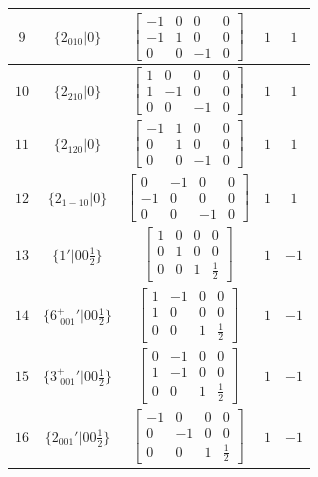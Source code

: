 \documentclass[fleqn,8pt]{jsarticle}
\begin{document}
\begin{longtable}{ccccc}
$ 9 $ & $ \{2{}_{010}|0\} $ & $ \begin{bmatrix} -1 & 0 & 0 & 0 \\ -1 & 1 & 0 & 0 \\ 0 & 0 & -1 & 0 \end{bmatrix} $ & $ 1 $ & $ 1 $ \\ \hline
$ 10 $ & $ \{2{}_{210}|0\} $ & $ \begin{bmatrix} 1 & 0 & 0 & 0 \\ 1 & -1 & 0 & 0 \\ 0 & 0 & -1 & 0 \end{bmatrix} $ & $ 1 $ & $ 1 $ \\ \hline
$ 11 $ & $ \{2{}_{120}|0\} $ & $ \begin{bmatrix} -1 & 1 & 0 & 0 \\ 0 & 1 & 0 & 0 \\ 0 & 0 & -1 & 0 \end{bmatrix} $ & $ 1 $ & $ 1 $ \\ \hline
$ 12 $ & $ \{2{}_{1-10}|0\} $ & $ \begin{bmatrix} 0 & -1 & 0 & 0 \\ -1 & 0 & 0 & 0 \\ 0 & 0 & -1 & 0 \end{bmatrix} $ & $ 1 $ & $ 1 $ \\ \hline
$ 13 $ & $ \{1{}'|0 0 \frac{1}{2}\} $ & $ \begin{bmatrix} 1 & 0 & 0 & 0 \\ 0 & 1 & 0 & 0 \\ 0 & 0 & 1 & \frac{1}{2} \end{bmatrix} $ & $ 1 $ & $ -1 $ \\ \hline
$ 14 $ & $ \{6^{+}_{\,\,001}{}'|0 0 \frac{1}{2}\} $ & $ \begin{bmatrix} 1 & -1 & 0 & 0 \\ 1 & 0 & 0 & 0 \\ 0 & 0 & 1 & \frac{1}{2} \end{bmatrix} $ & $ 1 $ & $ -1 $ \\ \hline
$ 15 $ & $ \{3^{+}_{\,\,001}{}'|0 0 \frac{1}{2}\} $ & $ \begin{bmatrix} 0 & -1 & 0 & 0 \\ 1 & -1 & 0 & 0 \\ 0 & 0 & 1 & \frac{1}{2} \end{bmatrix} $ & $ 1 $ & $ -1 $ \\ \hline
$ 16 $ & $ \{2{}_{001}{}'|0 0 \frac{1}{2}\} $ & $ \begin{bmatrix} -1 & 0 & 0 & 0 \\ 0 & -1 & 0 & 0 \\ 0 & 0 & 1 & \frac{1}{2} \end{bmatrix} $ & $ 1 $ & $ -1 $ \\ \hline

\end{longtable}
\end{document}
